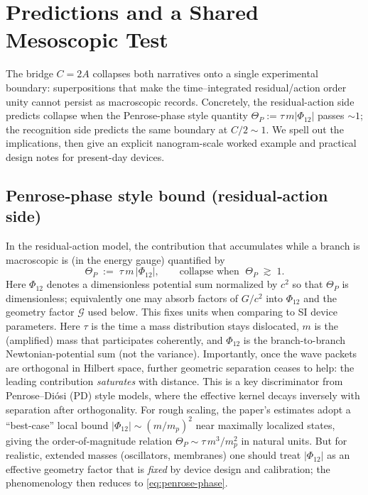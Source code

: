 \documentclass[11pt,letterpaper]{article}
\theoremstyle{definition}
\begin{document}
\section{Predictions and a Shared Mesoscopic Test}
\label{sec:predictions-test}

The bridge $C=2A$ collapses both narratives onto a single experimental boundary: superpositions that make the time–integrated residual/action order unity cannot persist as macroscopic records. Concretely, the residual-action side predicts collapse when the Penrose-phase style quantity $\Theta_{P}:=\tau\,m\lvert \Phi_{12}\rvert$ passes $\sim 1$; the recognition side predicts the same boundary at $C/2\sim 1$. We spell out the implications, then give an explicit nanogram-scale worked example and practical design notes for present-day devices. 

\subsection{Penrose‑phase style bound (residual‑action side)}

In the residual-action model, the contribution that accumulates while a branch is macroscopic is (in the energy gauge) quantified by
\begin{equation}
\Theta_{P}\;:=\;\tau\,m\,\lvert \Phi_{12}\rvert,
\qquad\text{collapse when }\;\Theta_{P}\;\gtrsim\;1.
\label{eq:penrose-phase}
\end{equation}
Here $\Phi_{12}$ denotes a dimensionless potential sum normalized by $c^2$ so that $\Theta_P$ is dimensionless; equivalently one may absorb factors of $G/c^2$ into $\Phi_{12}$ and the geometry factor $\mathcal G$ used below. This fixes units when comparing to SI device parameters.
Here $\tau$ is the time a mass distribution stays dislocated, $m$ is the (amplified) mass that participates coherently, and $\Phi_{12}$ is the branch-to-branch Newtonian-potential sum (not the variance). Importantly, once the wave packets are orthogonal in Hilbert space, further geometric separation ceases to help: the leading contribution \emph{saturates} with distance. This is a key discriminator from Penrose–Diósi (PD) style models, where the effective kernel decays inversely with separation after orthogonality. %
For rough scaling, the paper’s estimates adopt a ``best-case'' local bound $\lvert \Phi_{12}\rvert\sim (m/m_p)^2$ near maximally localized states, giving the order-of-magnitude relation $\Theta_{P}\sim \tau\,m^3/m_p^2$ in natural units. But for realistic, extended masses (oscillators, membranes) one should treat $\lvert \Phi_{12}\rvert$ as an effective geometry factor that is \emph{fixed} by device design and calibration; the phenomenology then reduces to \eqref{eq:penrose-phase}. %
\end{document}
